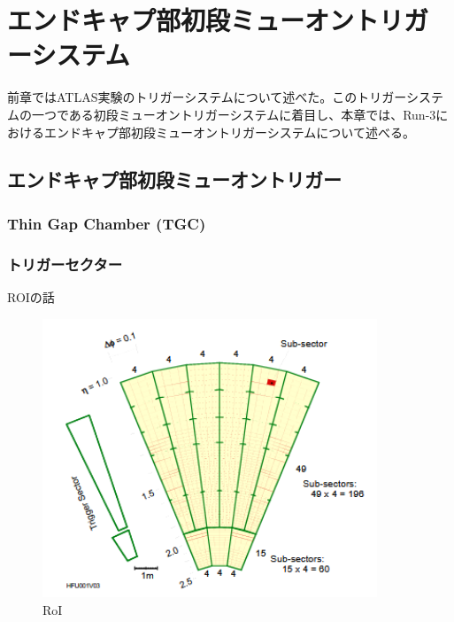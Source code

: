 \chapter{エンドキャプ部初段ミューオントリガーシステム}
前章ではATLAS実験のトリガーシステムについて述べた。このトリガーシステムの一つである初段ミューオントリガーシステムに着目し、本章では、Run-3におけるエンドキャプ部初段ミューオントリガーシステムについて述べる。

\section{エンドキャプ部初段ミューオントリガー}
\subsection{Thin Gap Chamber (TGC)}

\subsection{トリガーセクター}
ROIの話
\begin{figure}[tb]
  \centering
  \includegraphics[clip, width=10cm]{fig/3/RoI.png}
  \caption{RoI}
  \label{fig:RoI}
\end{figure}


